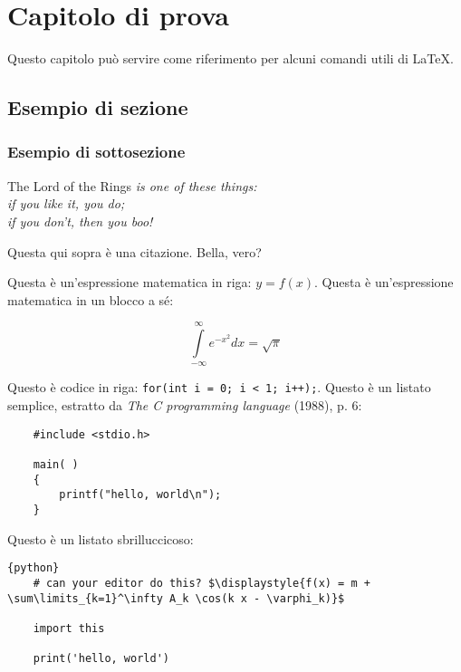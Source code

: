 \chapter{Capitolo di prova}

Questo capitolo può servire come riferimento per alcuni comandi utili di \LaTeX.

\section{Esempio di sezione}

\subsection{Esempio di sottosezione}

\begin{displayquote}[J. R. R. Tolkien]
	The Lord of the Rings \textit{is one of these things: \\ if you like it, you do; \\ if you don't, then you boo!}
\end{displayquote}

Questa qui sopra è una citazione. Bella, vero?

Questa è un'espressione matematica in riga: $y = f(x)$. Questa è un'espressione matematica in un blocco a sé:

\begin{equation}
	\int\limits_{-\infty}^\infty e^{-x^2}dx = \sqrt{\pi}
\end{equation}

Questo è codice in riga: \verb|for(int i = 0; i < 1; i++);|. Questo è un listato semplice, estratto da \textit{The C programming language} (1988), p. 6:

\begin{verbatim}
    #include <stdio.h>

    main( )
    {
        printf("hello, world\n");
    }
\end{verbatim}

Questo è un listato sbrilluccicoso:

\begin{lstlisting}[mathescape,gobble=2]{python}
    # can your editor do this? $\displaystyle{f(x) = m + \sum\limits_{k=1}^\infty A_k \cos(k x - \varphi_k)}$

    import this

    print('hello, world')
\end{lstlisting}
